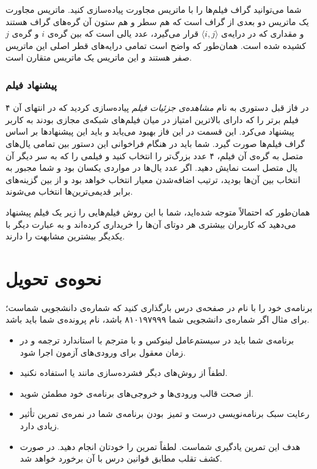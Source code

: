 \documentclass{utap}
\begin{document}
    شما می‌توانید گراف فیلم‌ها را با ماتریس مجاورت پیاده‌سازی کنید. ماتریس مجاورت یک ماتریس دو بعدی از گراف است که هم سطر و هم ستون آن گره‌های گراف هستند و مقداری که در درایه‌ی $\langle i, j\rangle$ قرار می‌گیرد، عدد یالی است که بین گره‌ی $i$ و گره‌ی $j$ کشیده شده است.
    همان‌طور که واضح است تمامی درایه‌های قطر اصلی این ماتریس صفر هستند و این ماتریس یک ماتریس متقارن است.

    \subsubsection{پیشنهاد فیلم}

    در فاز قبل دستوری به نام \textit{مشاهده‌ی جزئیات فیلم} پیاده‌سازی کردید که در انتهای آن ۴ فیلم برتر را که دارای بالاترین امتیاز در میان فیلم‌های شبکه‌ی مجازی بودند به کاربر پیشنهاد می‌کرد. این قسمت در این فاز بهبود می‌یابد و باید این پیشنهادها بر اساس گراف فیلم‌ها صورت گیرد. شما باید در هنگام فراخوانی این دستور بین تمامی یال‌های متصل به گره‌ی آن فیلم، ۴ عدد بزرگ‌تر را انتخاب کنید و فیلمی را که به سر دیگر آن یال متصل است نمایش دهید. اگر عدد یال‌ها در مواردی یکسان بود و شما مجبور به انتخاب بین آن‌ها بودید، ترتیب اضافه‌شدن معیار انتخاب خواهد بود و از بین گزینه‌های برابر قدیمی‌ترین‌ها انتخاب می‌شوند.

    همان‌طور که احتمالاً متوجه شده‌اید، شما با این روش فیلم‌هایی را زیر یک فیلم پیشنهاد می‌دهید که کاربران بیشتری هر دوتای آن‌ها را خریداری کرده‌اند و به عبارت دیگر با یکدیگر بیشترین مشابهت را دارند.
    
    \section{نحوه‌ی تحویل}

    برنامه‌ی خود را با نام  در صفحه‌ی  درس بارگذاری کنید که  شماره‌ی دانشجویی شماست؛ برای مثال اگر شماره‌ی دانشجویی شما ۸۱۰۱۹۷۹۹۹ باشد، نام پرونده‌ی شما باید  باشد.

    \begin{itemize}
        \item برنامه‌ی شما باید در سیستم‌عامل لینوکس و با مترجم  با استاندارد  ترجمه و در زمان معقول برای ورودی‌های آزمون اجرا شود.
        \item لطفاً از روش‌های دیگر فشرده‌سازی مانند  یا  استفاده نکنید.
        \item از صحت قالب ورودی‌ها و خروجی‌های برنامه‌ی خود مطمئن شوید.
        \item رعایت سبک برنامه‌نویسی درست و تمیز~بودن برنامه‌ی شما در نمره‌ی تمرین تأثیر زیادی دارد.
        \item هدف این تمرین یادگیری شماست. لطفاً تمرین را خودتان انجام دهید. در صورت کشف تقلب مطابق قوانین درس با آن برخورد خواهد شد.
    \end{itemize}
\end{document}
